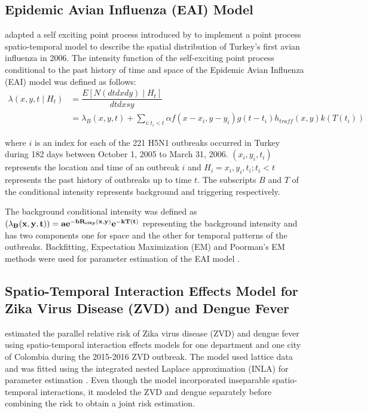 \subsection{Epidemic Avian Influenza (EAI) Model}

\citet{Kim:2011} adapted a self exciting point process introduced by \citet{Hawkes:1974} to implement a point process spatio-temporal model to describe the spatial distribution of Turkey's first avian influenza in 2006. The intensity function of the self-exciting point process conditional to the past history of time and space of the Epidemic Avian Influenza (EAI) model was defined as follows:
\begin{align}
\lambda(x,y,t \mid H_t) &= \dfrac{E\left[ N(dt dx dy) \mid H_t\right]}{dt dx sy}\\
&= \lambda_B(x,y,t) + \sum_{i:t_i<t}\alpha f(x - x_i, y-y_i) g(t - t_i) h_{traff}(x,y)k(T(t_i))
\end{align}

where $i$ is an index for each of the 221 H5N1 outbreaks occurred in Turkey during 182 days between October 1, 2005 to March 31, 2006. $(x_i, y_i, t_i)$ represents the location and time of an outbreak $i$ and $H_i = {x_i, y_i, t_i ; t_i < t}$ represents the past history of outbreaks up to time $t$. The subscripts $B$ and $T$ of the conditional intensity represents background and triggering respectively.

The background conditional intensity was defined as $\bf(\lambda_B(x,y,t)) = ae^{-bR_{city}(x,y)} e^{-kT(t)}$ representing the background intensity and has two components one for space and the other for temporal patterns of the outbreaks. Backfitting, Expectation Maximization (EM) and Poorman's EM methods were used for parameter estimation of the EAI model \citep{Kim:2011}.

\subsection{Spatio-Temporal Interaction Effects Model for Zika Virus Disease (ZVD) and Dengue Fever}

\citet{MartinezBello:2018} estimated the parallel relative risk of Zika virus disease (ZVD) and dengue fever using spatio-temporal interaction effects models for one department and one city of Colombia during the 2015-2016 ZVD outbreak. The model used lattice data and was fitted using the integrated nested Laplace approximation (INLA) for parameter estimation \citep{MartinezBello:2018}. Even though the model incorporated inseparable spatio-temporal interactions, it modeled the ZVD and dengue separately before combining the risk to obtain a joint risk estimation.

